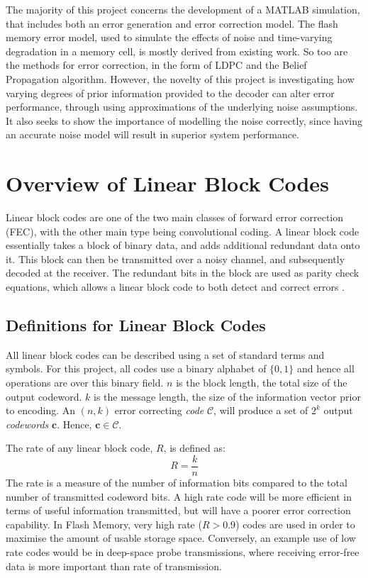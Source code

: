 \documentclass[11pt]{article}
\numberwithin{equation}{subsection}
\begin{document}
The majority of this project concerns the development of a MATLAB simulation, that includes both an error generation and error correction model. The flash memory error model, used to simulate the effects of noise and time-varying degradation in a memory cell, is mostly derived from existing work. So too are the methods for error correction, in the form of LDPC and the Belief Propagation algorithm. However, the novelty of this project is investigating how varying degrees of prior information provided to the decoder can alter error performance, through using approximations of the underlying noise assumptions. It also seeks to show the importance of modelling the noise correctly, since having an accurate noise model will result in superior system performance.

\section{Overview of Linear Block Codes}

Linear block codes are one of the two main classes of forward error correction (FEC), with the other main type being convolutional coding. A linear block code essentially takes a block of binary data, and adds additional redundant data onto it. This block can then be transmitted over a noisy channel, and subsequently decoded at the receiver. The redundant bits in the block are used as parity check equations, which allows a linear block code to both detect and correct errors \cite{tse2005fundamentals,proakis2001digital,haykin2008communication}.

\subsection{Definitions for Linear Block Codes} \label{3.1:definitions}
All linear block codes can be described using a set of standard terms and symbols. For this project, all codes use a binary alphabet of $\{0,1\}$ and hence all operations are over this binary field. $n$ is the block length, the total size of the output codeword. $k$ is the message length, the size of the information vector prior to encoding. An $(n,k)$ error correcting \textit{code} $\mathcal{C}$, will produce a set of $2^k$ output \textit{codewords} $\mathbf{c}$. Hence, $\mathbf{c} \in \mathcal{C}$. 

The rate of any linear block code, $R$, is defined as: 
\begin{equation}
R = \dfrac{k}{n}
\end{equation}
The rate is a measure of the number of information bits compared to the total number of transmitted codeword bits. A high rate code will be more efficient in terms of useful information transmitted, but will have a poorer error correction capability. In Flash Memory, very high rate ($R > 0.9$) codes are used in order to maximise the amount of usable storage space. Conversely, an example use of low rate codes would be in deep-space probe transmissions, where receiving error-free data is more important than rate of transmission.
\end{document}
